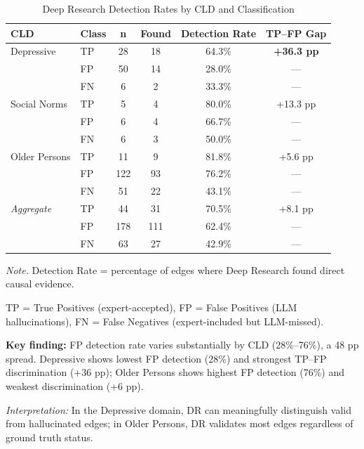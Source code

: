 \documentclass{article}
\begin{document}
\begin{table}[H]
\centering
\caption{Deep Research Detection Rates by CLD and Classification}
\label{tab:rq3_per_cld}
\begin{threeparttable}
\begin{tabular}{llcccc}
\toprule
\textbf{CLD} & \textbf{Class} & \textbf{n} & \textbf{Found} & \textbf{Detection Rate} & \textbf{TP--FP Gap} \\
\midrule
Depressive & TP & 28 & 18 & 64.3\% & \textbf{+36.3 pp} \\
 & FP & 50 & 14 & 28.0\% & --- \\
 & FN & 6 & 2 & 33.3\% & --- \\
\midrule
Social Norms & TP & 5 & 4 & 80.0\% & +13.3 pp \\
 & FP & 6 & 4 & 66.7\% & --- \\
 & FN & 6 & 3 & 50.0\% & --- \\
\midrule
Older Persons & TP & 11 & 9 & 81.8\% & +5.6 pp \\
 & FP & 122 & 93 & 76.2\% & --- \\
 & FN & 51 & 22 & 43.1\% & --- \\
\midrule
\textit{Aggregate} & TP & 44 & 31 & 70.5\% & +8.1 pp \\
 & FP & 178 & 111 & 62.4\% & --- \\
 & FN & 63 & 27 & 42.9\% & --- \\
\bottomrule
\end{tabular}
\begin{tablenotes}
\small
\item \textit{Note.} Detection Rate = percentage of edges where Deep Research found direct causal evidence.
\item TP = True Positives (expert-accepted), FP = False Positives (LLM hallucinations), FN = False Negatives (expert-included but LLM-missed).
\item \textbf{Key finding:} FP detection rate varies substantially by CLD (28\%--76\%), a 48 pp spread. Depressive shows lowest FP detection (28\%) and strongest TP--FP discrimination (+36 pp); Older Persons shows highest FP detection (76\%) and weakest discrimination (+6 pp).
\item \textit{Interpretation:} In the Depressive domain, DR can meaningfully distinguish valid from hallucinated edges; in Older Persons, DR validates most edges regardless of ground truth status.
\end{tablenotes}
\end{threeparttable}
\end{table}
\end{document}
